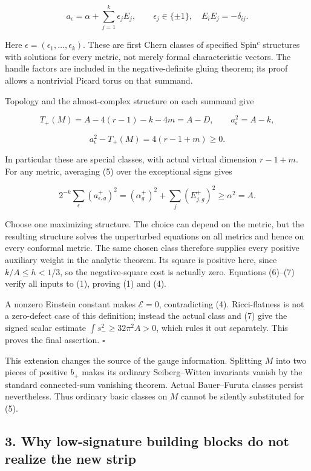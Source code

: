\documentclass[
  11pt,
]{article}
\begin{document}
\[
 a_{\epsilon}=\alpha+\sum_{j=1}^k\epsilon_jE_j,
 \qquad \epsilon_j\in\{\pm1\},\quad E_iE_j=-\delta_{ij}.
 \tag{5}
\]

Here \(\epsilon=(\epsilon_1,\ldots,\epsilon_k)\). These are first Chern
classes of specified Spin\(^c\) structures with solutions for every
metric, not merely formal characteristic vectors. The handle factors are
included in the negative-definite gluing theorem; its proof allows a
nontrivial Picard torus on that summand.

Topology and the almost-complex structure on each summand give

\[
 T_+(M)=A-4(r-1)-k-4m=A-D,
 \qquad a_{\epsilon}^2=A-k,
\]

\[
 a_{\epsilon}^2-T_+(M)=4(r-1+m)\ge0.
 \tag{6}
\]

In particular these are special classes, with actual virtual dimension
\(r-1+m\). For any metric, averaging (5) over the exceptional signs
gives

\[
 2^{-k}\sum_{\epsilon}(a_{\epsilon,g}^+)^2
   =(\alpha_g^+)^2+\sum_j(E_{j,g}^+)^2
   \ge\alpha^2=A.
 \tag{7}
\]

Choose one maximizing structure. The choice can depend on the metric,
but the resulting structure solves the unperturbed equations on all
metrics and hence on every conformal metric. The same chosen class
therefore supplies every positive auxiliary weight in the analytic
theorem. Its square is positive here, since \(k/A\le h<1/3\), so the
negative-square cost is actually zero. Equations (6)--(7) verify all
inputs to (1), proving (1) and (4).

A nonzero Einstein constant makes \(\mathcal E=0\), contradicting (4).
Ricci-flatness is not a zero-defect case of this definition; instead the
actual class and (7) give the signed scalar estimate
\(\int s_-^2\ge32\pi^2A>0\), which rules it out separately. This proves
the final assertion. \(\square\)

This extension changes the source of the gauge information. Splitting
\(M\) into two pieces of positive \(b_+\) makes its ordinary
Seiberg--Witten invariants vanish by the standard connected-sum
vanishing theorem. Actual Bauer--Furuta classes persist nevertheless.
Thus ordinary basic classes on \(M\) cannot be silently substituted for
(5).

\hypertarget{why-low-signature-building-blocks-do-not-realize-the-new-strip}{%
\subsection{3. Why low-signature building blocks do not realize the new
strip}\label{why-low-signature-building-blocks-do-not-realize-the-new-strip}}
\end{document}
